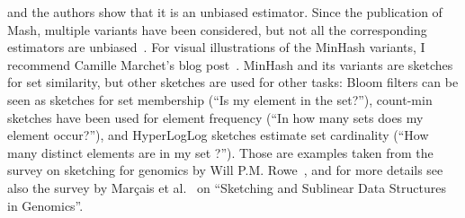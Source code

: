 and the authors show that it is an unbiased estimator. Since the publication of Mash, multiple variants have been considered, but not all the corresponding estimators are unbiased~\cite{10.1093/bioinformatics/btac244}. For visual illustrations of the MinHash variants, I recommend Camille Marchet's blog post~\cite{camsketch}.
%
MinHash and its variants are sketches for set similarity, but other sketches are used for other tasks: Bloom filters can be seen as sketches for set membership (``Is my element in the set?''), count-min sketches have been used for element frequency (``In how many sets does my element occur?''), and HyperLogLog sketches estimate set cardinality (``How many distinct elements are in my set ?''). Those are examples taken from the survey on sketching for genomics by Will P.M. Rowe~\cite{rowe2019levee}, and for more details see also the survey by Marçais et al.~\cite{marccais2019sketching} on ``Sketching and Sublinear Data Structures in Genomics''.

